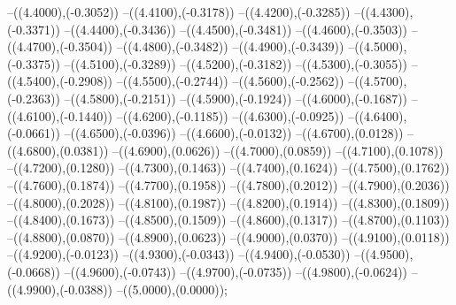{	--({\sx*(4.4000)},{\sy*(-0.3052)})
	--({\sx*(4.4100)},{\sy*(-0.3178)})
	--({\sx*(4.4200)},{\sy*(-0.3285)})
	--({\sx*(4.4300)},{\sy*(-0.3371)})
	--({\sx*(4.4400)},{\sy*(-0.3436)})
	--({\sx*(4.4500)},{\sy*(-0.3481)})
	--({\sx*(4.4600)},{\sy*(-0.3503)})
	--({\sx*(4.4700)},{\sy*(-0.3504)})
	--({\sx*(4.4800)},{\sy*(-0.3482)})
	--({\sx*(4.4900)},{\sy*(-0.3439)})
	--({\sx*(4.5000)},{\sy*(-0.3375)})
	--({\sx*(4.5100)},{\sy*(-0.3289)})
	--({\sx*(4.5200)},{\sy*(-0.3182)})
	--({\sx*(4.5300)},{\sy*(-0.3055)})
	--({\sx*(4.5400)},{\sy*(-0.2908)})
	--({\sx*(4.5500)},{\sy*(-0.2744)})
	--({\sx*(4.5600)},{\sy*(-0.2562)})
	--({\sx*(4.5700)},{\sy*(-0.2363)})
	--({\sx*(4.5800)},{\sy*(-0.2151)})
	--({\sx*(4.5900)},{\sy*(-0.1924)})
	--({\sx*(4.6000)},{\sy*(-0.1687)})
	--({\sx*(4.6100)},{\sy*(-0.1440)})
	--({\sx*(4.6200)},{\sy*(-0.1185)})
	--({\sx*(4.6300)},{\sy*(-0.0925)})
	--({\sx*(4.6400)},{\sy*(-0.0661)})
	--({\sx*(4.6500)},{\sy*(-0.0396)})
	--({\sx*(4.6600)},{\sy*(-0.0132)})
	--({\sx*(4.6700)},{\sy*(0.0128)})
	--({\sx*(4.6800)},{\sy*(0.0381)})
	--({\sx*(4.6900)},{\sy*(0.0626)})
	--({\sx*(4.7000)},{\sy*(0.0859)})
	--({\sx*(4.7100)},{\sy*(0.1078)})
	--({\sx*(4.7200)},{\sy*(0.1280)})
	--({\sx*(4.7300)},{\sy*(0.1463)})
	--({\sx*(4.7400)},{\sy*(0.1624)})
	--({\sx*(4.7500)},{\sy*(0.1762)})
	--({\sx*(4.7600)},{\sy*(0.1874)})
	--({\sx*(4.7700)},{\sy*(0.1958)})
	--({\sx*(4.7800)},{\sy*(0.2012)})
	--({\sx*(4.7900)},{\sy*(0.2036)})
	--({\sx*(4.8000)},{\sy*(0.2028)})
	--({\sx*(4.8100)},{\sy*(0.1987)})
	--({\sx*(4.8200)},{\sy*(0.1914)})
	--({\sx*(4.8300)},{\sy*(0.1809)})
	--({\sx*(4.8400)},{\sy*(0.1673)})
	--({\sx*(4.8500)},{\sy*(0.1509)})
	--({\sx*(4.8600)},{\sy*(0.1317)})
	--({\sx*(4.8700)},{\sy*(0.1103)})
	--({\sx*(4.8800)},{\sy*(0.0870)})
	--({\sx*(4.8900)},{\sy*(0.0623)})
	--({\sx*(4.9000)},{\sy*(0.0370)})
	--({\sx*(4.9100)},{\sy*(0.0118)})
	--({\sx*(4.9200)},{\sy*(-0.0123)})
	--({\sx*(4.9300)},{\sy*(-0.0343)})
	--({\sx*(4.9400)},{\sy*(-0.0530)})
	--({\sx*(4.9500)},{\sy*(-0.0668)})
	--({\sx*(4.9600)},{\sy*(-0.0743)})
	--({\sx*(4.9700)},{\sy*(-0.0735)})
	--({\sx*(4.9800)},{\sy*(-0.0624)})
	--({\sx*(4.9900)},{\sy*(-0.0388)})
	--({\sx*(5.0000)},{\sy*(0.0000)});
}
